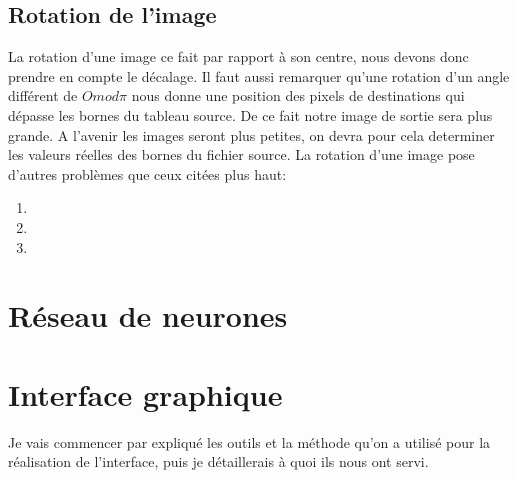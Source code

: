 \documentclass[]{report}
\begin{document}
        \section{Rotation de l'image}
        \label{principe}
        La rotation d'une image ce fait par rapport à son centre, nous devons donc prendre en compte le décalage.
        Il faut aussi remarquer qu'une rotation d'un angle différent de $O mod \pi$ nous donne une position des
        pixels de destinations qui dépasse les bornes du tableau source. De ce fait notre image
        de sortie sera plus grande. A l'avenir les images seront plus petites, on devra pour cela determiner les valeurs réelles
        des bornes du fichier source.
        La rotation d'une image pose d'autres problèmes que ceux citées plus haut:
        \begin{enumerate}
          \item
          \item
          \item
        \end{enumerate}


	\chapter{R\'eseau de neurones} %
	\label{cha:r'eseau_de_neurones}




	\chapter{Interface graphique} %
	\label{cha:interface_graphique}
	Je vais commencer par expliqu\'e les outils et la m\'ethode qu'on a utilis\'e pour la r\'ealisation de l'interface, puis je d\'etaillerais \`a quoi ils nous ont servi.
\end{document}

